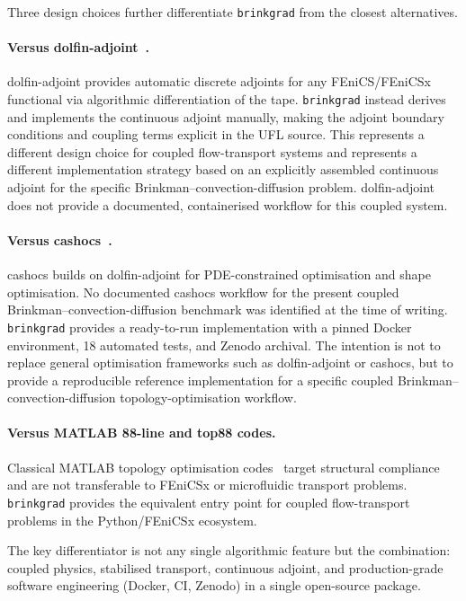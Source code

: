 Three design choices further differentiate \texttt{brinkgrad}
from the closest alternatives.

\paragraph{Versus dolfin-adjoint~\cite{farrell2013}.}
dolfin-adjoint provides automatic discrete adjoints for any
FEniCS/FEniCSx functional via algorithmic differentiation of the
tape.
\texttt{brinkgrad} instead derives and implements the continuous
adjoint manually, making the adjoint boundary conditions and
coupling terms explicit in the UFL source.
This represents a different design choice for coupled flow-transport systems
and represents a different implementation strategy based on
an explicitly assembled continuous adjoint for the specific
Brinkman--convection-diffusion problem.
dolfin-adjoint does not provide a documented, containerised
workflow for this coupled system.

\paragraph{Versus cashocs~\cite{blauth2023}.}
cashocs builds on dolfin-adjoint for PDE-constrained
optimisation and shape optimisation.
No documented cashocs workflow for the present coupled
Brinkman--convection-diffusion benchmark was identified
at the time of writing.
\texttt{brinkgrad} provides a ready-to-run implementation
with a pinned Docker environment, 18 automated tests, and Zenodo archival.
The intention is not to replace general optimisation frameworks
such as dolfin-adjoint or cashocs, but to provide a reproducible
reference implementation for a specific coupled
Brinkman--convection-diffusion topology-optimisation workflow.

\paragraph{Versus MATLAB 88-line and top88 codes.}
Classical MATLAB topology optimisation codes~\cite{andreassen2011}
target structural compliance and are not transferable to
FEniCSx or microfluidic transport problems.
\texttt{brinkgrad} provides the equivalent entry point
for coupled flow-transport problems in the Python/FEniCSx ecosystem.

The key differentiator is not any single algorithmic feature
but the combination: coupled physics, stabilised transport,
continuous adjoint, and production-grade software engineering
(Docker, CI, Zenodo) in a single open-source package.


